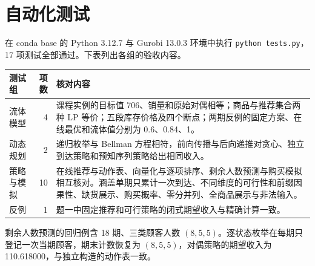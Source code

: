 \section{自动化测试}\label{app:tests}
在 conda base 的 Python 3.12.7 与 Gurobi 13.0.3 环境中执行 \texttt{python tests.py}，17 项测试全部通过。下表列出各组的验收内容。
\begin{center}
\small
\begin{tabularx}{\linewidth}{@{}l r X@{}}
\toprule
测试组 & 项数 & 核对内容 \\
\midrule
流体模型 & 4 & 课程实例的目标值 706、销量和原始对偶相等；商品与推荐集合两种 LP 等价；五段库存价格及四个断点；两期反例的固定方案、在线最优和流体值分别为 0.6、0.84、1。\\
动态规划 & 2 & 递归枚举与 Bellman 方程相符，前向传播与后向递推对贪心、独立到达策略和预知序列策略给出相同收入。\\
策略与模拟 & 10 & 在线推荐与动作表、向量化与逐项排序、剩余人数预测与购买模拟相互核对。涵盖单期只累计一次到达、不同维度的可行性和前缀因果性、缺货展示、购买概率、零分并列、全商品展示与非法输入。\\
反例 & 1 & 题一中固定推荐和可行策略的闭式期望收入与精确计算一致。\\
\bottomrule
\end{tabularx}
\end{center}

剩余人数预测的回归例含 18 期、三类顾客人数 $(8,5,5)$。逐状态枚举在每期只登记一次当期顾客，期末计数恢复为 $(8,5,5)$，对偶策略的期望收入为 110.618000，与独立构造的动作表一致。
